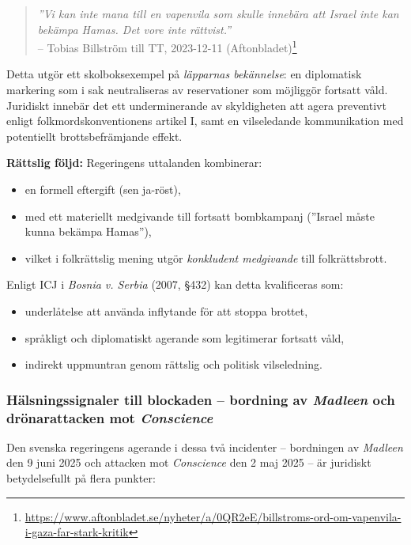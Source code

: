 \begin{quote}
\textit{”Vi kan inte mana till en vapenvila som skulle innebära att Israel inte kan bekämpa Hamas. Det vore inte rättvist.”} \\
– Tobias Billström till TT, 2023-12-11 (Aftonbladet)\footnote{\url{https://www.aftonbladet.se/nyheter/a/0QR2eE/billstroms-ord-om-vapenvila-i-gaza-far-stark-kritik}}
\end{quote}

Detta utgör ett skolboksexempel på \textit{läpparnas bekännelse}: en diplomatisk markering som i sak neutraliseras av reservationer som möjliggör fortsatt våld. Juridiskt innebär det ett underminerande av skyldigheten att agera preventivt enligt folkmordskonventionens artikel I, samt en vilseledande kommunikation med potentiellt brottsbefrämjande effekt.

\textbf{Rättslig följd:} Regeringens uttalanden kombinerar:
\begin{itemize}
  \item en formell eftergift (sen ja-röst),
  \item med ett materiellt medgivande till fortsatt bombkampanj (”Israel måste kunna bekämpa Hamas”),
  \item vilket i folkrättslig mening utgör \textit{konkludent medgivande} till folkrättsbrott.
\end{itemize}

Enligt ICJ i \textit{Bosnia v. Serbia} (2007, §432) kan detta kvalificeras som:
\begin{itemize}
  \item underlåtelse att använda inflytande för att stoppa brottet,
  \item språkligt och diplomatiskt agerande som legitimerar fortsatt våld,
  \item indirekt uppmuntran genom rättslig och politisk vilseledning.
\end{itemize}


\subsubsection{Hälsningssignaler till blockaden – bordning av \textit{Madleen} och drönarattacken mot \textit{Conscience}}

Den svenska regeringens agerande i dessa två incidenter – bordningen av \textit{Madleen} den 9 juni 2025 och attacken mot \textit{Conscience} den 2 maj 2025 – är juridiskt betydelsefullt på flera punkter:


